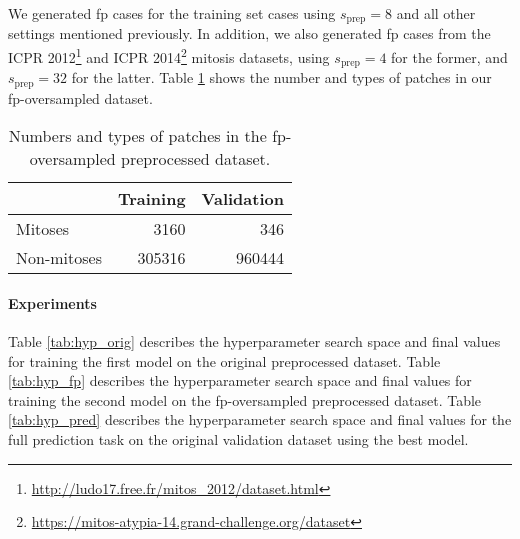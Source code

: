 We generated \gls{fp} cases for the training set cases using $s_\text{prep} = 8$ and all other settings mentioned previously.  In addition, we also generated \gls{fp} cases from the ICPR 2012\footnote{\url{http://ludo17.free.fr/mitos\_2012/dataset.html}} and ICPR 2014\footnote{\url{https://mitos-atypia-14.grand-challenge.org/dataset}} mitosis datasets, using $s_\text{prep} = 4$ for the former, and $s_\text{prep} = 32$ for the latter.  Table \ref{tab:data_fp} shows the number and types of patches in our \gls{fp}-oversampled dataset.

\begin{table}%
  \centering
  \begin{tabular}{l | r | r}
    & Training  & Validation \\
    \hline
    Mitoses     & 3160   & 346 \\
    Non-mitoses & 305316 & 960444 \\
  \end{tabular}
  \caption{Numbers and types of patches in the \gls{fp}-oversampled preprocessed dataset.}
  \label{tab:data_fp}
\end{table}


\paragraph{Experiments}
Table \ref{tab:hyp_orig} describes the hyperparameter search space and final values for training the first model on the original preprocessed dataset.  Table \ref{tab:hyp_fp} describes the hyperparameter search space and final values for training the second model on the \gls{fp}-oversampled preprocessed dataset.  Table \ref{tab:hyp_pred} describes the hyperparameter search space and final values for the full prediction task on the original validation dataset using the best model.

